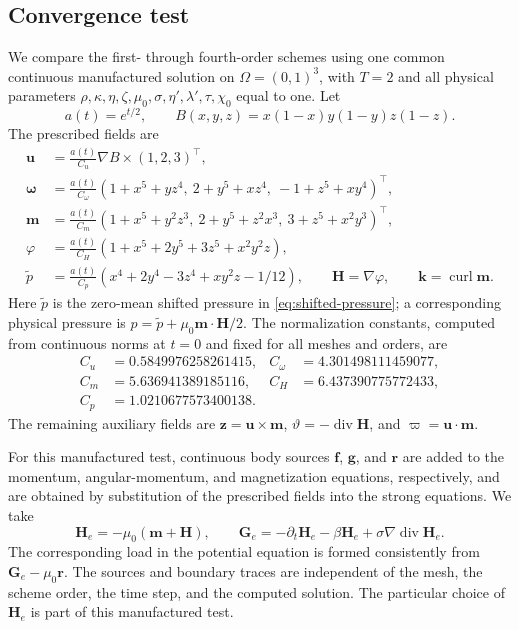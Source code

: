\documentclass[11pt,a4paper]{article}
\newcommand{\bs}{\boldsymbol}
\DeclareMathOperator{\curl}{curl}
\DeclareMathOperator{\ddiv}{div}
\newcommand{\Div}{\ddiv}
\newcommand{\pp}{\widetilde p}
\theoremstyle{definition}
\numberwithin{equation}{section}
\begin{document}
\subsection{Convergence test}
\label{subsec:convergencetest}

We compare the first- through fourth-order schemes using one common
continuous manufactured solution on $\Omega=(0,1)^3$, with $T=2$ and all
physical parameters $\rho,\kappa,\eta,\zeta,\mu_0,\sigma,
\eta',\lambda',\tau,\chi_0$ equal to one. Let
\[
 a(t)=e^{t/2},\qquad B(x,y,z)=x(1-x)y(1-y)z(1-z).
\]
The prescribed fields are
\begin{align*}
 \bs u&=\frac{a(t)}{C_u}\nabla B\times(1,2,3)^\intercal,\\
 \bs\omega&=\frac{a(t)}{C_\omega}
 (1+x^5+yz^4,\ 2+y^5+xz^4,\ -1+z^5+xy^4)^\intercal,\\
 \bs m&=\frac{a(t)}{C_m}
 (1+x^5+y^2z^3,\ 2+y^5+z^2x^3,\ 3+z^5+x^2y^3)^\intercal,\\
 \varphi&=\frac{a(t)}{C_H}
 (1+x^5+2y^5+3z^5+x^2y^2z),\\
 \pp&=\frac{a(t)}{C_p}
 (x^4+2y^4-3z^4+xy^2z-1/12),\qquad
 \bs H=\nabla\varphi,\qquad \bs k=\curl\bs m.
\end{align*}
Here $\pp$ is the zero-mean shifted pressure in
\eqref{eq:shifted-pressure}; a corresponding physical pressure is
$p=\pp+\mu_0\bs m\cdot\bs H/2$. The normalization constants, computed
from continuous norms at $t=0$ and fixed for all meshes and orders, are
\[
\begin{aligned}
 C_u&=0.5849976258261415,& C_\omega&=4.301498111459077,\\
 C_m&=5.636941389185116,& C_H&=6.437390775772433,\\
 C_p&=1.0210677573400138.&&
\end{aligned}
\]
The remaining auxiliary fields are
$\bs z=\bs u\times\bs m$, $\vartheta=-\Div\bs H$, and
$\varpi=\bs u\cdot\bs m$.

For this manufactured test, continuous body sources $\bs f$, $\bs g$,
and $\bs r$ are added to the momentum, angular-momentum, and
magnetization equations, respectively, and are obtained by substitution
of the prescribed fields into the strong equations. We take
\[
 \bs H_e=-\mu_0(\bs m+\bs H),\qquad
 \bs G_e=-\partial_t\bs H_e-\beta\bs H_e
           +\sigma\nabla\Div\bs H_e.
\]
The corresponding load in the potential equation is formed consistently
from $\bs G_e-\mu_0\bs r$. The sources and boundary traces are independent
of the mesh, the scheme order, the time step, and the computed solution.
The particular choice of $\bs H_e$ is part of this manufactured test.
\end{document}
